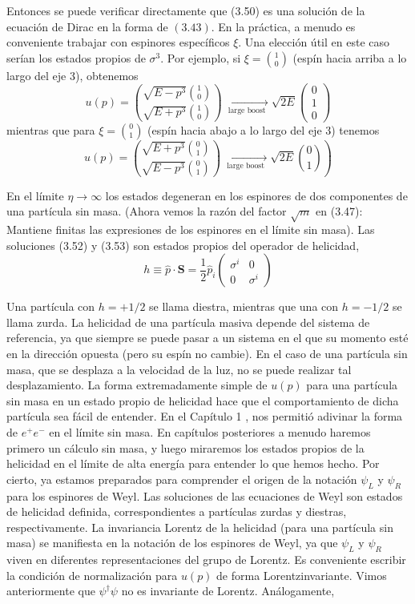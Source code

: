 Entonces se puede verificar directamente que (3.50) es una solución de la ecuación de Dirac en la forma de $(3.43)$. En la práctica, a menudo es conveniente trabajar con espinores específicos $\xi$. Una elección útil en este caso serían los estados propios de $\sigma^{3}$. Por ejemplo, si $\xi=\binom{1}{0}$ (espín hacia arriba a lo largo del eje 3), obtenemos
$$
u(p)=\binom{\sqrt{E-p^{3}}\binom{1}{0}}{\sqrt{E+p^{3}}\binom{1}{0}} \underset{\text { large boost }}{\longrightarrow} \sqrt{2 E}\left(\begin{array}{c}
0  \tag{3.52}\\
1 \\
0
\end{array}\right)
$$
mientras que para $\xi=\binom{0}{1}$ (espín hacia abajo a lo largo del eje 3) tenemos
$$
\begin{equation*}
\left.u(p)=\binom{\sqrt{E+p^{3}}\binom{0}{1}}{\sqrt{E-p^{3}}\binom{0}{1}} \underset{\text { large boost }}{\longrightarrow} \sqrt{2 E}\binom{0}{1}\right) \tag{3.53}
\end{equation*}
$$

En el límite $\eta \rightarrow \infty$ los estados degeneran en los espinores de dos componentes de una partícula sin masa. (Ahora vemos la razón del factor $\sqrt{m}$ en (3.47): Mantiene finitas las expresiones de los espinores en el límite sin masa). Las soluciones (3.52) y (3.53) son estados propios del operador de helicidad,
$$
h \equiv \hat{p} \cdot \mathbf{S}=\frac{1}{2} \hat{p}_{i}\left(\begin{array}{cc}
\sigma^{i} & 0  \tag{3.54}\\
0 & \sigma^{i}
\end{array}\right)
$$

Una partícula con $h=+1 / 2$ se llama diestra, mientras que una con $h=-1 / 2$ se llama zurda. La helicidad de una partícula masiva depende del sistema de referencia, ya que siempre se puede pasar a un sistema en el que su momento esté en la dirección opuesta (pero su espín no cambie). En el caso de una partícula sin masa, que se desplaza a la velocidad de la luz, no se puede realizar tal desplazamiento. La forma extremadamente simple de $u(p)$ para una partícula sin masa en un estado propio de helicidad hace que el comportamiento de dicha partícula sea fácil de entender. En el Capítulo 1 , nos permitió adivinar la forma de $e^{+} e^{-}$ en el límite sin masa. En capítulos posteriores a menudo haremos primero un cálculo sin masa, y luego miraremos los estados propios de la helicidad en el límite de alta energía para entender lo que hemos hecho. Por cierto, ya estamos preparados para comprender el origen de la notación $\psi_{L}$ y $\psi_{R}$ para los espinores de Weyl. Las soluciones de las ecuaciones de Weyl son estados de helicidad definida, correspondientes a partículas zurdas y diestras, respectivamente. La invariancia Lorentz de la helicidad (para una partícula sin masa) se manifiesta en la notación de los espinores de Weyl, ya que $\psi_{L}$ y $\psi_{R}$ viven en diferentes representaciones del grupo de Lorentz. Es conveniente escribir la condición de normalización para $u(p)$ de forma Lorentzinvariante. Vimos anteriormente que $\psi^{\dagger} \psi$ no es invariante de Lorentz. Análogamente,



